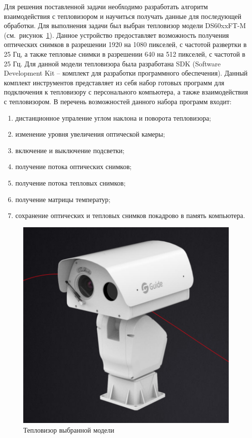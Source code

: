 \documentclass[14pt, a4paper]{extreport}
\begin{document}
	Для решения поставленной задачи необходимо разработать алгоритм взаимодействия с тепловизором и научиться получать данные для последующей обработки. Для выполнения задачи был выбран тепловизор модели DS60xxFT-M (см.~рисунок~\ref{fig:teploviser}). Данное устройство предоставляет возможность получения оптических снимков в разрешении 1920 на 1080 пикселей, с частотой развертки в 25 Гц, а также тепловые снимки в разрешении 640 на 512 пикселей, с частотой в 25 Гц. Для данной модели тепловизора была разработана SDK (Software Development Kit -- комплект для разработки программного обеспечения). Данный комплект инструментов представляет из себя набор готовых программ для подключения к тепловизору с персонального компьютера, а также взаимодействия с тепловизором. В перечень возможностей данного набора программ входит:
	
	\begin{enumerate}[label={\arabic*)}]
		\item дистанционное упраление углом наклона и поворота тепловизора;
		\item изменение уровня увеличения оптической камеры;
		\item включение и выключение подсветки;
		\item получение потока оптических снимков;
		\item получение потока тепловых снимков;
		\item получение матрицы температур;
		\item сохранение оптических и тепловых снимков покадрово в память компьютера.
	\end{enumerate}

	\begin{figure}[h!]
		\centering
		\includegraphics[width = 13cm]{image/chapter_2/teploviser}	
		\caption{Тепловизор выбранной модели}
		\label{fig:teploviser}
	\end{figure}
\end{document}
